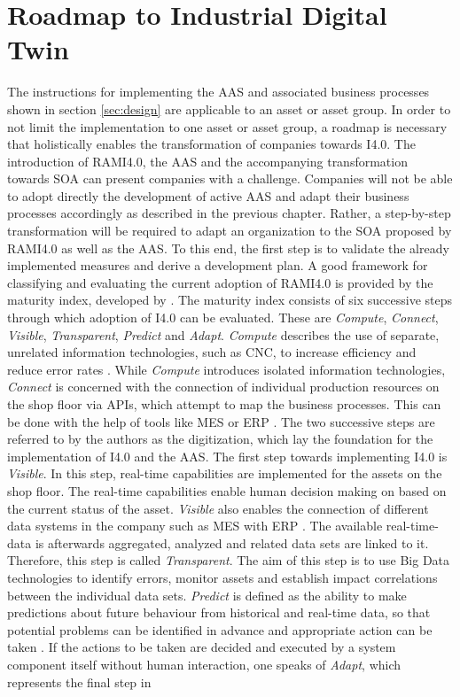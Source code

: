 \section{Roadmap to Industrial Digital Twin}
The instructions for implementing the \ac{AAS} and associated business processes shown in section \ref{sec:design} are applicable to an asset or asset group. In order to not limit the implementation to one asset or asset group, a roadmap is necessary that holistically enables the transformation of companies towards \ac{I4.0}. The introduction of \ac{RAMI4.0}, the \ac{AAS} and the accompanying transformation towards \ac{SOA} can present companies with a challenge. Companies will not be able to adopt directly the development of active \ac{AAS} and adapt their business processes accordingly as described in the previous chapter. Rather, a step-by-step transformation will be required to adapt an organization to the \ac{SOA} proposed by \ac{RAMI4.0} as well as the \ac{AAS}. To this end, the first step is to validate the already implemented measures and derive a development plan. A good framework for classifying and evaluating the current adoption of \ac{RAMI4.0} is provided by the maturity index, developed by \cite[p. 15]{Schuh2020IndustrieAcatech}. The maturity index consists of six successive steps through which adoption of \ac{I4.0} can be evaluated. These are \textit{Compute}, \textit{Connect}, \textit{Visible}, \textit{Transparent}, \textit{Predict} and \textit{Adapt}. \textit{Compute} describes the use of separate, unrelated information technologies, such as \ac{CNC}, to increase efficiency and reduce error rates \cite[p. 15]{Schuh2020IndustrieAcatech}. While \textit{Compute} introduces isolated information technologies, \textit{Connect} is concerned with the connection of individual production resources on the shop floor via \ac{API}s, which attempt to map the business processes. This can be done with the help of tools like \ac{MES} or \ac{ERP} \cite[p. 16]{Schuh2020IndustrieAcatech}. The two successive steps are referred to by the authors as the digitization, which lay the foundation for the implementation of \ac{I4.0} and the \ac{AAS}. The first step towards implementing \ac{I4.0} is \textit{Visible}. In this step, real-time capabilities are implemented for the assets on the shop floor. The real-time capabilities enable human decision making on based on the current status of the asset. \textit{Visible} also enables the connection of different data systems in the company such as \ac{MES} with \ac{ERP} \cite[p. 17]{Schuh2020IndustrieAcatech}. The available real-time-data is afterwards aggregated, analyzed and related data sets are linked to it. Therefore, this step is called \textit{Transparent}. The aim of this step is to use Big Data technologies to identify errors, monitor assets and establish impact correlations between the individual data sets. \textit{Predict} is defined as the ability to make predictions about future behaviour from historical and real-time data, so that potential problems can be identified in advance and appropriate action can be taken \cite[p. 19]{Schuh2020IndustrieAcatech}. If the actions to be taken are decided and executed by a system component itself without human interaction, one speaks of \textit{Adapt}, which represents the final step in 